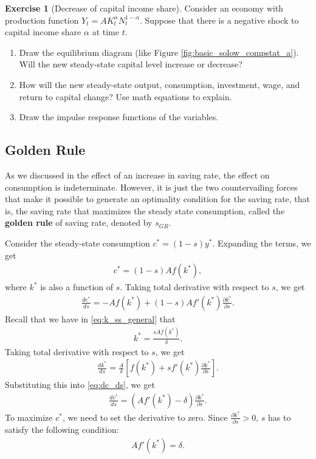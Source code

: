 \documentclass{book}
\theoremstyle{definition}
\newtheorem{exercise}{Exercise}[chapter]
\theoremstyle{plain}
\begin{document}
\begin{exercise}[Decrease of capital income share]
    Consider an economy with production function $Y_t = A K_t^{\alpha} N_t^{1-\alpha}$. Suppose that there is a negative shock to capital income share $\alpha$ at time $t$.
    \begin{enumerate}[label=(\arabic*)]
        \item Draw the equilibrium diagram (like Figure \ref{fig:basic_solow_compstat_a}). Will the new steady-state capital level increase or decrease?
        \item How will the new steady-state output, consumption, investment, wage, and return to capital change? Use math equations to explain.
        \item Draw the impulse response functions of the variables. 
    \end{enumerate}
\end{exercise}

\subsection{Golden Rule}
As we discussed in the effect of an increase in saving rate, the effect on consumption is indeterminate. However, it is just the two countervailing forces that make it possible to generate an optimality condition for the saving rate, that is, the saving rate that maximizes the steady state consumption, called the \textbf{golden rule} of saving rate, denoted by $s_{GR}$.

Consider the steady-state consumption $c^* = (1-s) y^*$. Expanding the terms, we get
\begin{align*}
    c^* = (1-s) A f(k^*),
\end{align*}
where $k^*$ is also a function of $s$. Taking {\color{red} total derivative} with respect to $s$, we get
\begin{align}\label{eq:dc_ds}
    \frac{d c^*}{d s} = -A f(k^*) + (1-s) A f'(k^*) \frac{\partial k^*}{\partial s}.
\end{align}
Recall that we have in \eqref{eq:k_ss_general} that
\begin{align*}
    k^* = \frac{s A f(k^*)}{\delta}.
\end{align*}
Taking total derivative with respect to $s$, we get
\begin{align*}
    \frac{d k^*}{d s} = \frac{A}{\delta} \left[f(k^*) + s f'(k^*)\frac{\partial k^*}{\partial s}\right].
\end{align*}
Substituting this into \eqref{eq:dc_ds}, we get
\begin{align*}
    \frac{dc^*}{ds} = (Af'(k^*) - \delta) \frac{\partial k^*}{\partial s}.
\end{align*}
To maximize $c^*$, we need to set the derivative to zero. Since $\frac{\partial k^*}{\partial s} > 0$, $s$ has to satisfy the following condition:
\begin{align}\label{eq:golden_rule_s}
    Af'(k^*) = \delta.
\end{align}
\end{document}
